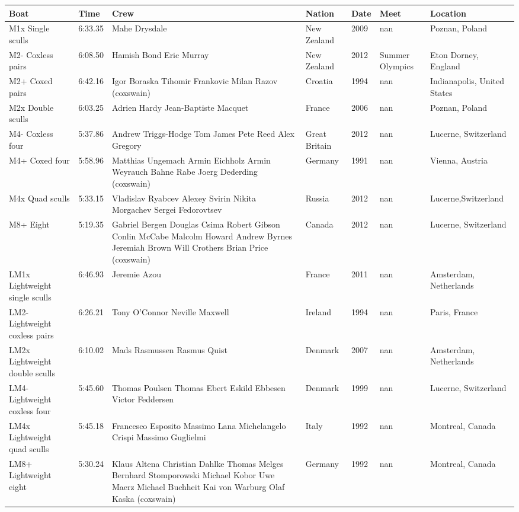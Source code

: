 \documentclass{article}
\begin{document}
\begin{tabular}{lllllll}
\toprule
Boat & Time & Crew & Nation & Date & Meet & Location \\
\midrule
M1x Single sculls & 6:33.35 & Mahe Drysdale & New Zealand & 2009 & nan & Poznan, Poland \\
M2- Coxless pairs & 6:08.50 & Hamish Bond Eric Murray & New Zealand & 2012 & Summer Olympics & Eton Dorney, England \\
M2+ Coxed pairs & 6:42.16 & Igor Boraska Tihomir Frankovic Milan Razov (coxswain) & Croatia & 1994 & nan & Indianapolis, United States \\
M2x Double sculls & 6:03.25 & Adrien Hardy Jean-Baptiste Macquet & France & 2006 & nan & Poznan, Poland \\
M4- Coxless four & 5:37.86 & Andrew Triggs-Hodge Tom James Pete Reed Alex Gregory & Great Britain & 2012 & nan & Lucerne, Switzerland \\
M4+ Coxed four & 5:58.96 & Matthias Ungemach Armin Eichholz Armin Weyrauch Bahne Rabe Joerg Dederding (coxswain) & Germany & 1991 & nan & Vienna, Austria \\
M4x Quad sculls & 5:33.15 & Vladislav Ryabcev Alexey Svirin Nikita Morgachev Sergei Fedorovtsev & Russia & 2012 & nan & Lucerne,Switzerland \\
M8+ Eight & 5:19.35 & Gabriel Bergen Douglas Csima Robert Gibson Conlin McCabe Malcolm Howard Andrew Byrnes Jeremiah Brown Will Crothers Brian Price (coxswain) & Canada & 2012 & nan & Lucerne, Switzerland \\
LM1x Lightweight single sculls & 6:46.93 & Jeremie Azou & France & 2011 & nan & Amsterdam, Netherlands \\
LM2- Lightweight coxless pairs & 6:26.21 & Tony O'Connor Neville Maxwell & Ireland & 1994 & nan & Paris, France \\
LM2x Lightweight double sculls & 6:10.02 & Mads Rasmussen Rasmus Quist & Denmark & 2007 & nan & Amsterdam, Netherlands \\
LM4- Lightweight coxless four & 5:45.60 & Thomas Poulsen Thomas Ebert Eskild Ebbesen Victor Feddersen & Denmark & 1999 & nan & Lucerne, Switzerland \\
LM4x Lightweight quad sculls & 5:45.18 & Francesco Esposito Massimo Lana Michelangelo Crispi Massimo Guglielmi & Italy & 1992 & nan & Montreal, Canada \\
LM8+ Lightweight eight & 5:30.24 & Klaus Altena Christian Dahlke Thomas Melges Bernhard Stomporowski Michael Kobor Uwe Maerz Michael Buchheit Kai von Warburg Olaf Kaska (coxswain) & Germany & 1992 & nan & Montreal, Canada \\
\bottomrule
\end{tabular}
\end{document}
